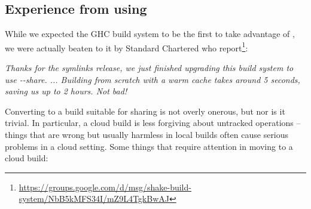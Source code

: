 \subsection{Experience from using \Cloud \Shake}\label{sec-using-cloud-shake}

While we expected the GHC build system to be the first to take advantage of
\Cloud \Shake, we were actually beaten to it by Standard Chartered who
report\footnote{\url{https://groups.google.com/d/msg/shake-build-system/NbB5kMFS34I/mZ9L4TgkBwAJ}}:

\vspace{1mm}
\begin{center}
\parbox{0.8 \textwidth}{\emph{Thanks for the symlinks release, we just finished
upgrading this build system to use \textsf{-}\textsf{-share}. ... Building from
scratch with a warm cache takes around 5 seconds, saving us up to 2 hours. Not
bad!}}
\end{center}
\vspace{1mm}


Converting to a build suitable for sharing is not overly onerous, but nor is it trivial.
In particular, a cloud build is less forgiving about untracked operations -- things that
are wrong but usually harmless in local builds often cause serious problems in a cloud setting.
Some things that require attention in moving to a cloud build:

